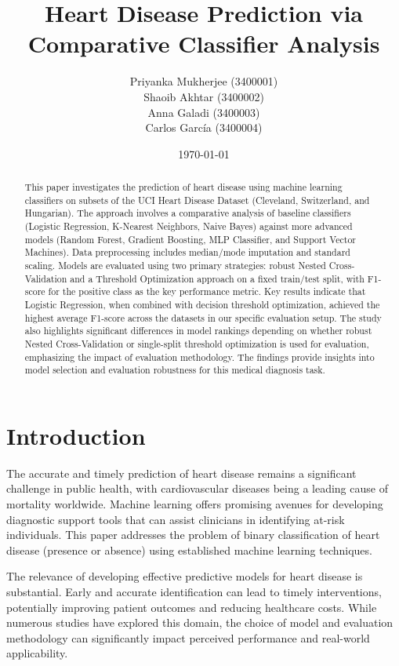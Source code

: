 \documentclass{article}
\title{Heart Disease Prediction via Comparative Classifier Analysis}
\author{
    Priyanka Mukherjee (3400001) \\
    Shaoib Akhtar (3400002) \\
    Anna Galadi (3400003) \\
    Carlos García (3400004)
}
\date{\today}
\begin{document}
\maketitle
\begin{abstract}
This paper investigates the prediction of heart disease using machine learning classifiers on subsets of the UCI Heart Disease Dataset (Cleveland, Switzerland, and Hungarian). The approach involves a comparative analysis of baseline classifiers (Logistic Regression, K-Nearest Neighbors, Naive Bayes) against more advanced models (Random Forest, Gradient Boosting, MLP Classifier, and Support Vector Machines). Data preprocessing includes median/mode imputation and standard scaling. Models are evaluated using two primary strategies: robust Nested Cross-Validation and a Threshold Optimization approach on a fixed train/test split, with F1-score for the positive class as the key performance metric. Key results indicate that Logistic Regression, when combined with decision threshold optimization, achieved the highest average F1-score across the datasets in our specific evaluation setup. The study also highlights significant differences in model rankings depending on whether robust Nested Cross-Validation or single-split threshold optimization is used for evaluation, emphasizing the impact of evaluation methodology. The findings provide insights into model selection and evaluation robustness for this medical diagnosis task.
\end{abstract}

\section{Introduction}
The accurate and timely prediction of heart disease remains a significant challenge in public health, with cardiovascular diseases being a leading cause of mortality worldwide. Machine learning offers promising avenues for developing diagnostic support tools that can assist clinicians in identifying at-risk individuals. This paper addresses the problem of binary classification of heart disease (presence or absence) using established machine learning techniques.

The relevance of developing effective predictive models for heart disease is substantial. Early and accurate identification can lead to timely interventions, potentially improving patient outcomes and reducing healthcare costs. While numerous studies have explored this domain, the choice of model and evaluation methodology can significantly impact perceived performance and real-world applicability.
\end{document}
